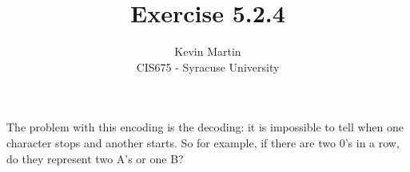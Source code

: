 \documentclass{article}
\author{Kevin Martin\\ CIS675 - Syracuse University}
\title{Exercise 5.2.4}
\begin{document}
\maketitle
The problem with this encoding is the decoding: it is impossible
to tell when one character stops and another starts. So for example,
if there are two 0's in a row, do they represent two A's or one B?
\end{document}
